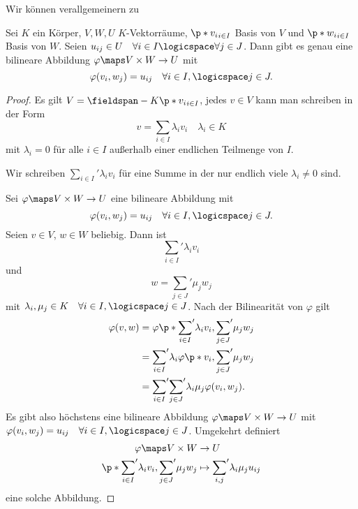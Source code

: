 Wir können  verallgemeinern zu 
\begin{lemmastrich}\label{}
  Sei \( K \) ein Körper, \( V,W,U \) \( K \)-Vektorräume, \( \p*{v_i}_{i\in I} \) Basis von \( V \) und \( \p*{w_i}_{i\in I} \) Basis von \( W \). Seien \( u_{ij}\in U \quad \forall i\in I\logicspace \forall j\in J\). Dann gibt es genau eine bilineare Abbildung \( \varphi\maps V\times W\to U \) mit
  \begin{equation*}
    \varphi(v_i,w_j)=u_{ij}\quad \forall i\in I, \logicspace j\in J.
  \end{equation*}
\end{lemmastrich}
\begin{proof}
  Es gilt \( V=\fieldspan-{K}{\p*{v_i}_{i\in I}} \), \dh jedes \( v\in V \) kann man schreiben in der Form
  \begin{equation*}
    v=\sum_{i\in I} \lambda_i v_i\quad \lambda_i\in K
  \end{equation*}
  mit \( \lambda_i=0 \) für alle \( i\in I \) außerhalb einer endlichen Teilmenge von \( I \).
  \begin{notation*}
    Wir schreiben \( {\sum_{i\in I}}'\lambda_i v_i \) für eine Summe in der nur endlich viele \( \lambda_i\neq 0 \) sind.
  \end{notation*}
  Sei \( \varphi\maps V\times W\to U \) eine bilineare Abbildung mit
  \begin{equation*}
    \varphi(v_i,w_j)=u_{ij} \quad \forall i\in I,\logicspace j\in J.
  \end{equation*}
  Seien \( v\in V \), \( w\in W \) beliebig. Dann ist
  \begin{equation*}
    {\sum_{i\in I}}' \lambda_i v_i
  \end{equation*}
  und
  \begin{equation*}
    w={\sum_{j\in J}}' \mu_j w_j
  \end{equation*}
  mit \( \lambda_i,\mu_j \in K\quad \forall i\in I,\logicspace j\in J \). Nach der Bilinearität von \( \varphi \) gilt
  \begin{align*}
    \varphi(v,w)&=\varphi\p*{{\sum_{i\in I}}'\lambda_i v_i,{\sum_{j\in J}}' \mu_j w_j}\\
    &={\sum_{i\in I}}'\lambda_i \varphi \p*{v_i,{\sum_{j\in J}}'\mu_j w_j}\\
    &={\sum_{i\in I}}'{\sum_{j\in J}}'\lambda_i \mu_j \varphi(v_i,w_j).
  \end{align*}
  Es gibt also höchstens eine bilineare Abbildung \( \varphi\maps V\times W\to U \) mit \( \varphi(v_i,w_j)=u_{ij}\quad \forall i\in I,\logicspace j\in J \). Umgekehrt definiert
  \begin{align*}
    \varphi\maps V\times W&\to U\\
    \p*{{\sum_{i\in I}}'\lambda_i v_i,{\sum_{j\in J}}'\mu_j w_j}&\mapsto {\sum_{i,j}}'\lambda_i \mu_j u_{ij}
  \end{align*}
  eine solche Abbildung.
\end{proof}

